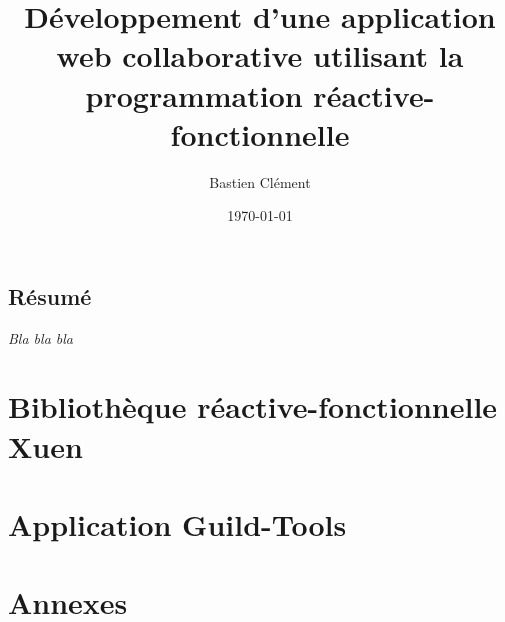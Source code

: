 \documentclass[11pt, a4paper, twoside, frenchb]{book}
\title{Développement d'une application web collaborative utilisant la programmation réactive-fonctionnelle}
\author{Bastien Clément}
\date{\today}
\begin{document}
\frontmatter
\maketitle

\chapter*{Résumé}

\textit{Bla bla bla}

\tableofcontents

\mainmatter


\part[Bibliothèque réactive-fonctionnelle]{Bibliothèque réactive-fonctionnelle \\
	\vspace{1cm} {\normalfont Xuen}}


%
%
%

\part{Application Guild-Tools}


\backmatter
\part{Annexes}



\end{document}
